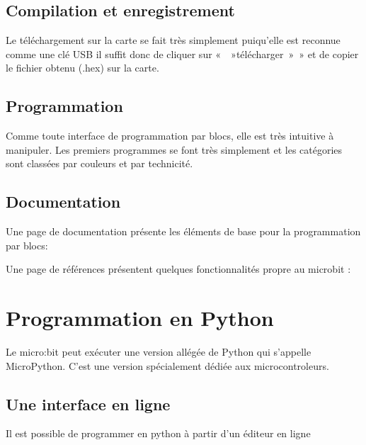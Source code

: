 \documentclass[letterpaper,10pt,french]{sphinxmanual}
\begin{document}
\subsection{Compilation et enregistrement}
\label{\detokenize{decouverte/prise_en_main_blocs:compilation-et-enregistrement}}
Le téléchargement sur la carte se fait très simplement puiqu’elle est reconnue comme une clé USB
il suffit donc de cliquer sur «  »télécharger » » et de copier le fichier obtenu (.hex) sur la carte.


\subsection{Programmation}
\label{\detokenize{decouverte/prise_en_main_blocs:programmation}}
Comme toute interface de programmation par blocs, elle est très intuitive à manipuler.
Les premiers programmes se font très simplement et les catégories sont classées par couleurs
et par technicité.
\begin{quote}
\end{quote}


\subsection{Documentation}
\label{\detokenize{decouverte/prise_en_main_blocs:documentation}}
Une page de documentation présente les éléments de base pour la programmation par blocs:

Une page de références présentent quelques fonctionnalités propre au microbit :


\section{Programmation en Python}
\label{\detokenize{decouverte/prise_en_main_python:dec-python}}\label{\detokenize{decouverte/prise_en_main_python:programmation-en-python}}\label{\detokenize{decouverte/prise_en_main_python::doc}}
Le micro:bit peut exécuter une version allégée de Python qui s’appelle MicroPython.
C’est une version spécialement dédiée aux microcontroleurs.


\subsection{Une interface en ligne}
\label{\detokenize{decouverte/prise_en_main_python:une-interface-en-ligne}}
Il est possible de programmer en python à partir d’un éditeur en ligne
\end{document}

